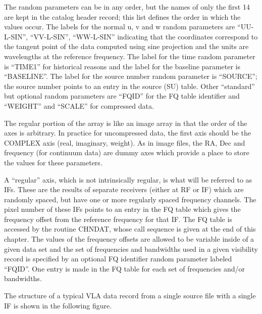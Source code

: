 The random parameters can be in any order, but the names of only the
first 14 are kept in the catalog header record; this list defines the
order in which the values occur.  The labels for the normal u, v and w
random parameters are ``UU-L-SIN'', ``VV-L-SIN'', ``WW-L-SIN''
indicating that the coordinates correspond to the tangent point of the
data computed using sine projection and the units are wavelengths at
the reference frequency.  The label for the time random parameter is
``TIME1'' for historical reasons and the label for the baseline
parameter is ``BASELINE''.  The label for the source number random
parameter is ``SOURCE''; the source number points to an entry in the
source (SU) table.  Other ``standard'' but optional random parameters
are ``FQID'' for the FQ table identifier and ``WEIGHT'' and ``SCALE''
for compressed data.

The regular portion of the array is like an image array in that the
order of the axes is arbitrary.  In practice for uncompressed data,
the first axis should be the COMPLEX axis (real, imaginary, weight).
As in image files, the RA, Dec and frequency (for continuum data) are
dummy axes which provide a place to store the values for these
parameters.

A ``regular'' axis, which is not intrinsically regular, is what will be
referred to as IFs.  These are the results of separate receivers
(either at RF or IF) which are randomly spaced, but have one or more
regularly spaced frequency channels.  The pixel number of these IFs
points to an entry in the FQ table which gives the frequency offset
from the reference frequency for that IF.  The FQ table is accessed by
the routine CHNDAT, whose call sequence is given at the end of this
chapter.  The values of the frequency offsets are allowed to be
variable inside of a given data set and the set of frequencies and
bandwidths used in a given visibility record is specified by an
optional FQ identifier random parameter labeled ``FQID''.  One entry
is made in the FQ table for each set of frequencies and/or bandwidths.

The structure of a typical VLA data record from a single source file
with a single IF is shown in the following figure.


